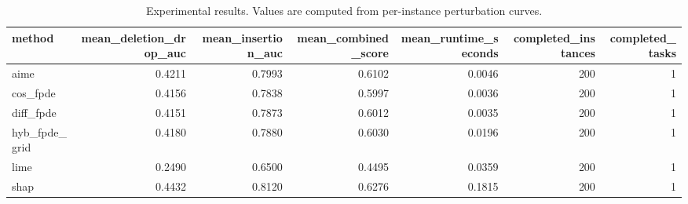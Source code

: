 \begin{table}[t]
\caption{Experimental results. Values are computed from per-instance perturbation curves.}
\label{tab:main_results_computed}
\centering
\begin{tabular}{lrrrrrr}
\toprule
method & mean\_deletion\_drop\_auc & mean\_insertion\_auc & mean\_combined\_score & mean\_runtime\_seconds & completed\_instances & completed\_tasks \\
\midrule
aime & 0.4211 & 0.7993 & 0.6102 & 0.0046 & 200 & 1 \\
cos\_fpde & 0.4156 & 0.7838 & 0.5997 & 0.0036 & 200 & 1 \\
diff\_fpde & 0.4151 & 0.7873 & 0.6012 & 0.0035 & 200 & 1 \\
hyb\_fpde\_grid & 0.4180 & 0.7880 & 0.6030 & 0.0196 & 200 & 1 \\
lime & 0.2490 & 0.6500 & 0.4495 & 0.0359 & 200 & 1 \\
shap & 0.4432 & 0.8120 & 0.6276 & 0.1815 & 200 & 1 \\
\bottomrule
\end{tabular}

\end{table}
